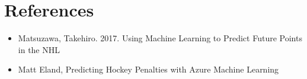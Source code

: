 \documentclass{report}
\begin{document}
	\section{References}
		\begin{itemize}
			\item Matsuzawa, Takehiro. 2017. Using Machine Learning to Predict Future Points in the NHL
			\item Matt Eland, Predicting Hockey Penalties with Azure Machine Learning
		\end{itemize}
\end{document}
